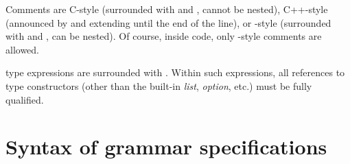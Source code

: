\documentclass[onecolumn,11pt,nocopyrightspace,preprint]{sigplanconf}
\begin{document}
Comments are C-style (surrounded with \kw{/*} and \kw{*/}, cannot be nested),
C++-style (announced by \kw{/$\!$/} and extending until the end of the line), or
\ocaml-style (surrounded with \kw{(*} and \kw{*)}, can be nested). Of course,
inside \ocaml code, only \ocaml-style comments are allowed.

\ocaml type expressions are surrounded with . Within such expressions,
all references to type constructors (other than the built-in \textit{list}, \textit{option}, etc.)
must be fully qualified.


\section{Syntax of grammar specifications}
\end{document}
